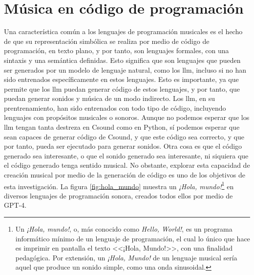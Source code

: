 \section{Música en código de programación}

Una característica común a los lenguajes de programación musicales es el hecho de que su representación simbólica se realiza por medio de código de programación, en texto plano, y por tanto, son lenguajes formales, con una sintaxis y una semántica definidas. Esto significa que son lenguajes que pueden ser generados por un modelo de lenguaje natural, como los \gls{llm}, incluso si no han sido entrenados específicamente en estos lenguajes. Esto es importante, ya que permite que los \gls{llm} puedan generar código de estos lenguajes, y por tanto, que puedan generar sonidos y música de un modo indirecto. Los \gls{llm}, en su prentrenamiento, han sido entrenados con todo tipo de código, incluyendo lenguajes con propósitos musicales o sonoros. Aunque no podemos esperar que los \gls{llm} tengan tanta destreza en Csound como en Python, sí podemos esperar que sean capaces de generar código de Csound, y que este código sea correcto, y que por tanto, pueda ser ejecutado para generar sonidos. Otra cosa es que el código generado sea interesante, o que el sonido generado sea interesante, ni siquiera que el código generado tenga sentido musical. No obstante, explorar esta capacidad de creación musical por medio de la generación de código es uno de los objetivos de esta investigación. La figura \ref{fig:hola_mundo} muestra un \textit{¡Hola, mundo!}\footnote{Un \textit{¡Hola, mundo!}, o, más conocido como \textit{Hello, World!}, es un programa informático mínimo de un lenguaje de programación, el cual lo único que hace es imprimir en pantalla el texto <<¡Hola, Mundo!>>, con una finalidad pedagógica. Por extensión, un \textit{¡Hola, Mundo!} de un lenguaje musical sería aquel que produce un sonido simple, como una onda sinusoidal.} en diversos lenguajes de programación sonora, creados todos ellos por medio de GPT-4.

